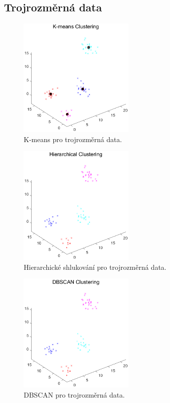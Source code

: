 \subsection{Trojrozměrná data}

\begin{figure}[H]
    \centering
    \includegraphics[width=0.5\textwidth]{images/3D_kmeans.eps}
    \caption{K-means pro trojrozměrná data.}
\end{figure}

\begin{figure}[H]
    \centering
    \includegraphics[width=0.5\textwidth]{images/3D_hierar.eps}
    \caption{Hierarchické shlukování pro trojrozměrná data.}
\end{figure}

\begin{figure}[H]
    \centering
    \includegraphics[width=0.5\textwidth]{images/3D_DBSCAN.eps}
    \caption{DBSCAN pro trojrozměrná data.}
\end{figure}

